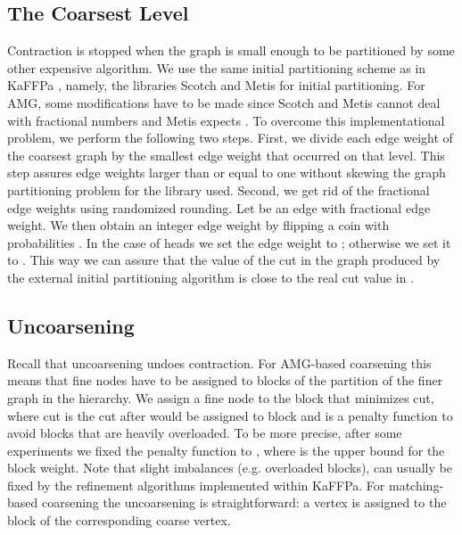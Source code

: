 \documentclass{llncs}
\begin{document}
\subsection{The Coarsest Level}
Contraction is stopped when the graph is small enough to be partitioned by some other expensive algorithm. We use the same initial partitioning scheme as in KaFFPa \cite{kaffpa}, namely, the libraries Scotch and Metis for initial partitioning.
For AMG, some modifications have to be made since Scotch and Metis cannot deal with fractional numbers and Metis expects . 
To overcome this implementational problem, we perform the following two steps. 
First, we divide each edge weight of the coarsest graph by the smallest edge weight that occurred on that level. 
This step assures edge weights larger than or equal to one without skewing the graph partitioning problem for the library used. 
Second, we get rid of the fractional edge weights using randomized rounding. Let  be an edge with fractional edge weight. We then obtain an integer edge weight   by flipping a coin with probabilities . 
In the case of heads we set the edge weight  to ; otherwise we set it to . This way we can assure that the value of the cut in the graph  produced by the external initial partitioning algorithm is close to the real cut value in . 

\subsection{Uncoarsening}\label{sec:uncoarsening}
Recall that uncoarsening undoes contraction. For AMG-based coarsening this means that fine nodes have to be assigned to blocks of the partition of the finer graph in the hierarchy. We assign a fine node  to the block that minimizes cut, where cut is the cut after  would be assigned to block  and  is a penalty function to avoid blocks that are heavily overloaded. To be more precise, after some experiments we fixed the penalty function to , where  is the upper bound for the block weight.
Note that slight imbalances (e.g. overloaded blocks), can usually be fixed by the refinement algorithms implemented within KaFFPa.
For matching-based coarsening the uncoarsening is straightforward: 
a vertex is assigned to the block of the corresponding coarse vertex.
\end{document}
